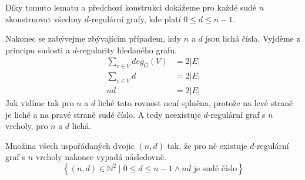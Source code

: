 \documentclass[../main.tex]{subfiles}
\begin{document}
Díky tomuto lematu a předchozí konstrukci dokážeme pro každé sudé $n$ zkonstruovat všechny $d$-regulární grafy, kde platí $0\leq d\leq n-1$. 

Nakonec se zabývejme zbývajícím případem, kdy $n$ a $d$ jsou lichá čísla. Vyjděme z principu sudosti a $d$-regularity hledaného grafu.
\begin{align*}
    \sum_{v\in V} deg_{G}(V) &= 2|E|\\
    \sum_{v\in V} d &= 2|E|\\
    n d &= 2|E|
\end{align*}
Jak vidíme tak pro $n$ a $d$ liché tato rovnost není splněna, protože na levé straně je liché a na pravé straně sudé číslo.
A tedy neexistuje $d$-regulární graf s $n$ vrcholy, pro $n$ a $d$ lichá.

Množina všech uspořádaných dvojic $(n,d)$ tak, že pro ně existuje $d$-regulární graf s $n$ vrcholy nakonec vypadá následovně.
\begin{equation*}
    \left\{  (n,d)\in\mathbb{N}^2 \mid  0\leq d\leq n-1 \wedge nd \text{ je sudé číslo} \right\}
\end{equation*}
\end{document}
